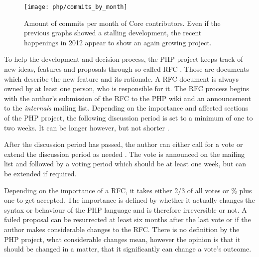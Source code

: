 \begin{figure}[htbp]
  \centering
  \texttt{[image: php/commits\_by\_month]}
  \caption[Commits by Month, PHP]
  {Amount of commits per month of Core contributors. Even if the previous
    graphs showed a stalling development, the recent happenings in 2012 appear
    to show an again growing project.}
\end{figure}

To help the development and decision process, the PHP project keeps track of
new ideas, features and proposals through so called \ac{RFC} \cite{PHPRFC}.
Those are documents which describe the new feature and its rationale. A
\ac{RFC} document is always owned by at least one person, who is responsible
for it. The \ac{RFC} process begins with the author's submission of the
\ac{RFC} to the PHP wiki and an announcement to the \emph{internals} mailing
list. Depending on the importance and affected sections of the PHP project, the
following discussion period is set to a minimum of one to two weeks. It can be
longer however, but not shorter \cite{PHPVoting}.

After the discussion period has passed, the author can either call for a vote
or extend the discussion period as needed \cite{PHPVoting}. The vote is
announced on the mailing list and followed by a voting period which should be
at least one week, but can be extended if required.

Depending on the importance of a \ac{RFC}, it takes either 2/3 of all votes or
\unit[50]{\%} plus one to get accepted. The importance is defined by whether it
actually changes the syntax or behaviour of the PHP language and is therefore
irreversible or not. A failed proposal can be resurrected at least six months
after the last vote or if the author makes considerable changes to the
\ac{RFC}. There is no definition by the PHP project, what considerable changes
mean, however the opinion is that it should be changed in a matter, that it
significantly can change a vote's outcome.

